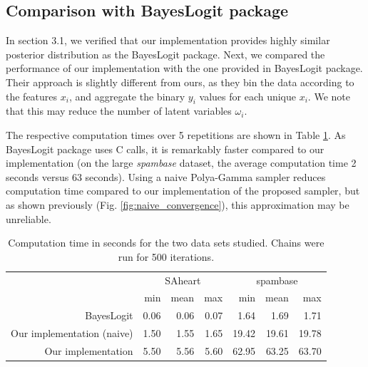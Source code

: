 \documentclass[a4paper]{article}\usepackage[]{graphicx}\usepackage[]{color}
\begin{document}
\subsection{Comparison with BayesLogit package}

In section 3.1, we verified that our implementation provides highly similar posterior distribution as the BayesLogit package. Next, we compared the performance of our implementation with the one provided in BayesLogit package. Their approach is slightly different from ours, as they bin the data according to the features $x_i$, and aggregate the binary $y_i$ values  for each unique $x_i$. We note that this may reduce the number of latent variables $\omega_i$.

The respective computation times over 5 repetitions are shown in Table \ref{tab:comptime}. As BayesLogit package uses C calls, it is remarkably faster compared to our implementation (on the large \emph{spambase} dataset, the average computation time 2 seconds versus 63 seconds). Using a naive Polya-Gamma sampler reduces computation time compared to our implementation of the proposed sampler, but as shown previously (Fig. \ref{fig:naive_convergence}), this approximation may be unreliable.

\begin{table}[!htbp]
\centering
\caption{Computation time in seconds for the two data sets studied. Chains were run for 500 iterations.}
\label{tab:comptime}
\begin{tabular}{rrrrrrr}
  \hline
  & \multicolumn{3}{c}{SAheart} & \multicolumn{3}{c}{spambase} \\
 & min & mean & max & min & mean & max \\
  \hline
BayesLogit & 0.06 & 0.06 & 0.07 & 1.64 & 1.69 & 1.71 \\
Our implementation (naive) & 1.50 & 1.55 & 1.65 & 19.42 & 19.61 & 19.78 \\
Our implementation & 5.50 & 5.56 & 5.60 & 62.95 & 63.25 & 63.70 \\
   \hline
\end{tabular}
\end{table}




\end{document}
